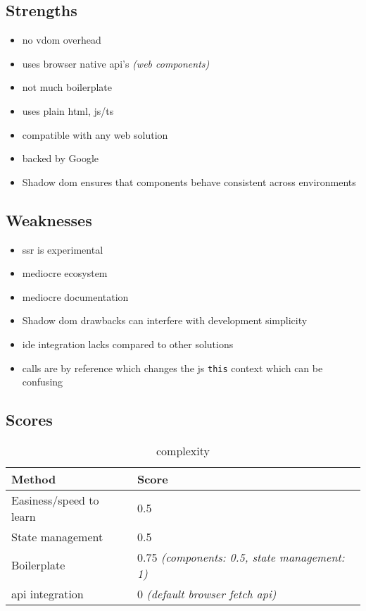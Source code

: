 \subsection{Strengths}
\label{subsec:lit:strengths}
\begin{itemize}
    \item no \acrshort{vdom} overhead
    \item uses browser native \acrshort{api}'s \textit{(web components)}
    \item not much boilerplate
    \item uses plain \acrshort{html}, \acrshort{js}/\acrshort{ts}
    \item compatible with any web solution
    \item backed by Google
    \item Shadow \acrshort{dom} ensures that components behave consistent across environments
\end{itemize}

\subsection{Weaknesses}
\label{subsec:lit:weaknesses}
\begin{itemize}
    \item \acrshort{ssr} is experimental
    \item mediocre ecosystem
    \item mediocre documentation
    \item Shadow \acrshort{dom} drawbacks can interfere with development simplicity
    \item \acrshort{ide} integration lacks compared to other solutions
    \item calls are by reference which changes the \acrshort{js} \texttt{this} context which can be confusing
\end{itemize}


\subsection{Scores}
\label{subsec:lit:scores}

\begin{table}[H]
    \centering
    \begin{tabular}{|l|l|}
        \hline
        \textbf{Method}            & \textbf{Score}                                       \\
        \hline
        Easiness/speed to learn    & 0.5                                                  \\ \hline
        State management           & 0.5                                                  \\ \hline
        Boilerplate                & 0.75 \textit{(components: 0.5, state management: 1)} \\ \hline
        \acrshort{api} integration & 0 \textit{(default browser fetch \acrshort{api})}    \\ \hline
    \end{tabular}
    \caption{complexity}
    \label{tab:lit:complexity}
\end{table}

